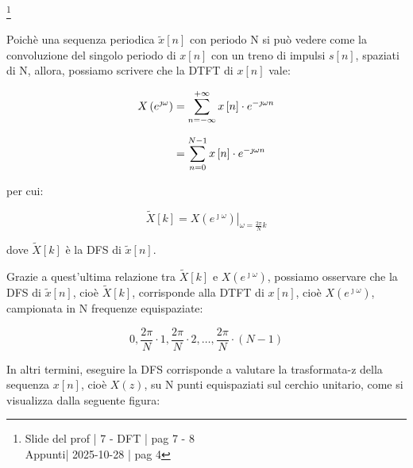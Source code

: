 \footnote{ 
    Slide del prof | 7 - DFT | pag 7 - 8\\
    Appunti| 2025-10-28 | pag 4   
}

Poichè una sequenza periodica $\tilde{x} \left[ n\right]$ con periodo N si può vedere come la convoluzione del singolo periodo di $x \left[ n\right]$ 
con un treno di impulsi $s \left[ n\right]$, spaziati di N, allora, possiamo scrivere che la DTFT di $x \left[ n\right]$ vale: 

{
    \Large 
    \begin{equation}
        \setlength{\jot}{10pt} %
        \begin{split}
        X \left(e^{\jmath \omega}\right) 
        &= 
        \sum_{n = - \infty}^{+ \infty}
        x \left[ n\right]
        \cdot 
        e^{- \jmath \omega n}
        \\
        &=
        \sum_{n = 0}^{N - 1}
        x \left[ n\right]
        \cdot 
        e^{- \jmath \omega n} 
        \end{split}
    \end{equation}
}

per cui: 

{
    \Large 
    \begin{equation}
        \tilde{X} \left[ k\right]
        = 
        \left. 
        X \left(e^{\jmath \omega}\right)
        \right|_{\omega = \frac{2 \pi}{N}k}
    \end{equation}
}

dove $\tilde{X} \left[ k\right]$ è la DFS di $\tilde{x} \left[ n\right]$. \newline 

Grazie a quest'ultima relazione tra $\tilde{X} \left[ k\right]$ e $X \left(e^{\jmath \omega}\right)$, 
possiamo osservare che la DFS di $\tilde{x} \left[ n\right]$, cioè $\tilde{X} \left[ k\right]$, corrisponde alla DTFT di $x \left[ n\right]$, cioè $X \left(e^{\jmath \omega}\right)$, 
campionata in N frequenze equispaziate: 

{
    \Large 
    \begin{equation}
        0, \dfrac{2 \pi}{N} \cdot 1, \dfrac{2 \pi}{N} \cdot 2, \dots, \dfrac{2 \pi}{N} \cdot \left(N - 1\right) 
    \end{equation}
}

In altri termini, eseguire la DFS corrisponde a valutare la trasformata-z della sequenza $x \left[ n\right]$, 
cioè $X \left(z\right)$, su N punti equispaziati sul cerchio unitario, come si visualizza dalla seguente figura: 

